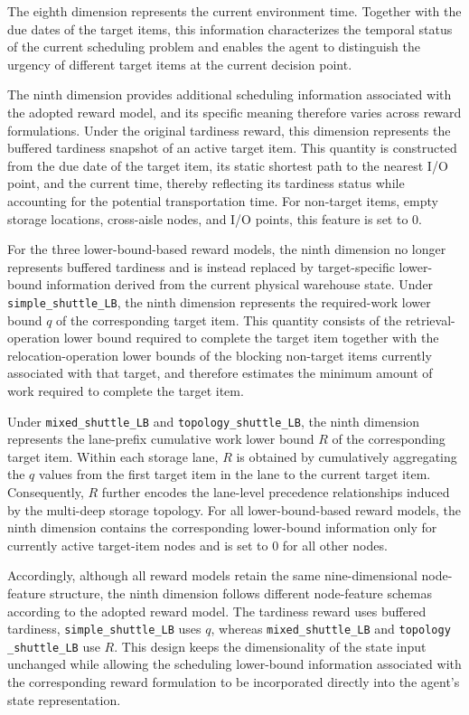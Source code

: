 The eighth dimension represents the current environment time. Together with the due dates of the target items, this information characterizes the temporal status of the current scheduling problem and enables the agent to distinguish the urgency of different target items at the current decision point.

The ninth dimension provides additional scheduling information associated with the adopted reward model, and its specific meaning therefore varies across reward formulations. Under the original tardiness reward, this dimension represents the buffered tardiness snapshot of an active target item. This quantity is constructed from the due date of the target item, its static shortest path to the nearest I/O point, and the current time, thereby reflecting its tardiness status while accounting for the potential transportation time. For non-target items, empty storage locations, cross-aisle nodes, and I/O points, this feature is set to $0$.

For the three lower-bound-based reward models, the ninth dimension no longer represents buffered tardiness and is instead replaced by target-specific lower-bound information derived from the current physical warehouse state. Under \texttt{simple\_shuttle\_LB}, the ninth dimension represents the required-work lower bound $q$ of the corresponding target item. This quantity consists of the retrieval-operation lower bound required to complete the target item together with the relocation-operation lower bounds of the blocking non-target items currently associated with that target, and therefore estimates the minimum amount of work required to complete the target item.

Under \texttt{mixed\_shuttle\_LB} and \texttt{topology\_shuttle\_LB}, the ninth dimension represents the lane-prefix cumulative work lower bound $R$ of the corresponding target item. Within each storage lane, $R$ is obtained by cumulatively aggregating the $q$ values from the first target item in the lane to the current target item. Consequently, $R$ further encodes the lane-level precedence relationships induced by the multi-deep storage topology. For all lower-bound-based reward models, the ninth dimension contains the corresponding lower-bound information only for currently active target-item nodes and is set to $0$ for all other nodes.

Accordingly, although all reward models retain the same nine-dimensional node-feature structure, the ninth dimension follows different node-feature schemas according to the adopted reward model. The tardiness reward uses buffered tardiness, \texttt{simple\_shuttle\_LB} uses $q$, whereas \texttt{mixed\_shuttle\_LB} and \texttt{topology} \texttt{\_shuttle\_LB} use $R$. This design keeps the dimensionality of the state input unchanged while allowing the scheduling lower-bound information associated with the corresponding reward formulation to be incorporated directly into the agent's state representation.

